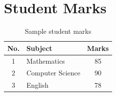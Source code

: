 \documentclass{article}
\begin{document}
\section{Student Marks}

\begin{table}[h]
\centering
\caption{Sample student marks}
\begin{tabular}{|c|l|c|}
\hline
No. & Subject & Marks \\
\hline
1 & Mathematics & 85 \\
2 & Computer Science & 90 \\
3 & English & 78 \\
\hline
\end{tabular}
\end{table}
\end{document}
